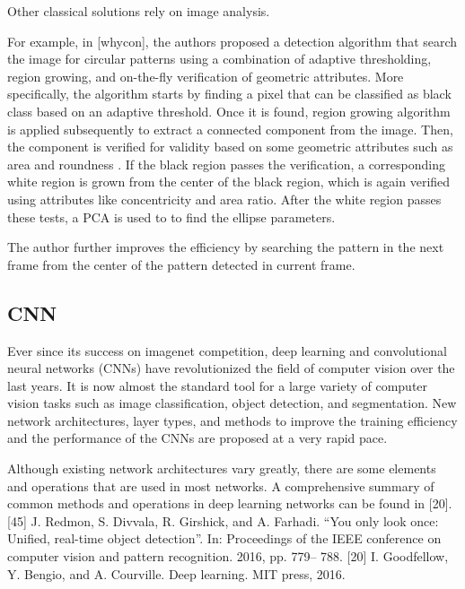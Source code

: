 \documentclass[a4paper]{report}
\begin{document}
Other classical solutions rely on image analysis.

For example, in [whycon], the authors proposed a detection algorithm that search the image for circular patterns using a combination of adaptive thresholding, region growing, and on-the-fly verification of geometric attributes. More specifically, the algorithm starts by finding a pixel that can be classified as black class based on an adaptive threshold. Once it is found, region growing algorithm is applied subsequently to extract a connected component from the image. Then, the component is verified for validity based on some geometric attributes such as area and roundness
. If the black region passes the verification, a corresponding white region is grown from the center of the black region, which is again verified using attributes like concentricity and area ratio. After the white region passes these tests, a PCA is used to to find the ellipse parameters.




The author further improves the efficiency by searching the pattern in the next frame from the center of the pattern detected in current frame. 






\subsection{CNN}
Ever since its success on imagenet competition, deep learning and convolutional neural networks (CNNs) have revolutionized the field of computer vision over the last
years. It is now almost the standard tool for a large
variety of computer vision tasks such as image classification, object detection, and segmentation. 
New network architectures, layer types, and methods to improve the training efficiency and the performance of the CNNs are proposed at a very rapid pace.

Although existing network architectures vary greatly, there are some elements and operations that are used in most networks. 
A comprehensive summary of common methods and operations in deep learning networks can be found in [20].
[45] J. Redmon, S. Divvala, R. Girshick, and A. Farhadi. “You only look
once: Unified, real-time object detection”. In: Proceedings of the IEEE
conference on computer vision and pattern recognition. 2016, pp. 779–
788.
[20] I. Goodfellow, Y. Bengio, and A. Courville. Deep learning. MIT press,
2016.
\end{document}
